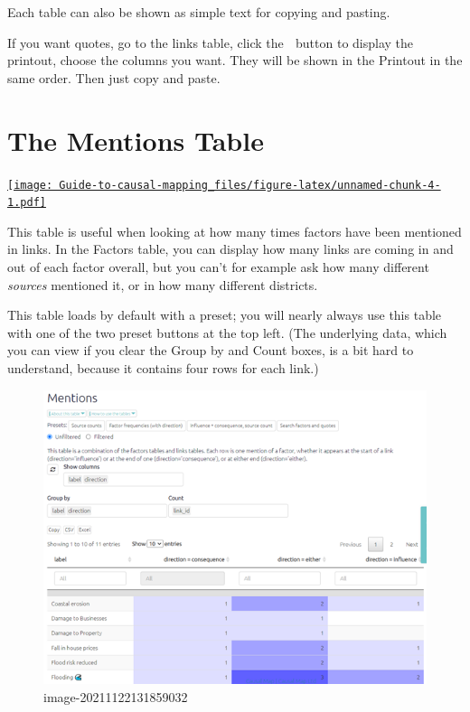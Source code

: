 \documentclass[
]{book}
\begin{document}
Each table can also be shown as simple text for copying and pasting.

If you want quotes, go to the links table, click the 📘 button to display the printout, choose the columns you want. They will be shown in the Printout in the same order. Then just copy and paste.

\hypertarget{xthe-mentions-table}{%
\chapter{The Mentions Table}\label{xthe-mentions-table}}

\href{https://player.vimeo.com/video/\%5B596594094\%5D(https://vimeo.com/596594094)}{\texttt{[image: Guide-to-causal-mapping\_files/figure-latex/unnamed-chunk-4-1.pdf]}}

This table is useful when looking at how many times factors have been mentioned in links. In the Factors table, you can display how many links are coming in and out of each factor overall, but you can't for example ask how many different \emph{sources} mentioned it, or in how many different districts.

This table loads by default with a preset; you will nearly always use this table with one of the two preset buttons at the top left. (The underlying data, which you can view if you clear the Group by and Count boxes, is a bit hard to understand, because it contains four rows for each link.)

\begin{figure}
\centering
\includegraphics[width=6.77083in,height=\textheight]{_assets/image-20211122131859032.png}
\caption{image-20211122131859032}
\end{figure}
\end{document}
